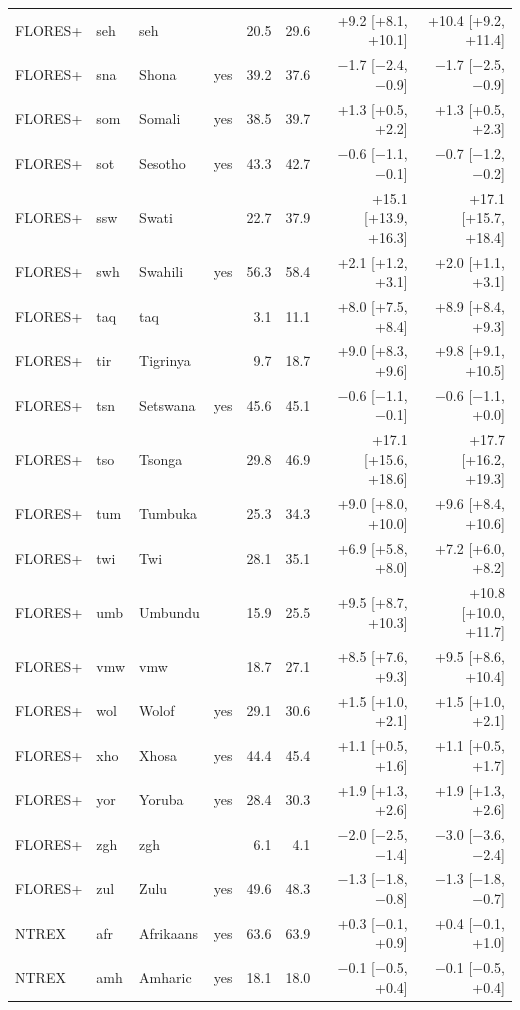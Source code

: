 {\begin{longtable}{@{}lllcrrrr@{}}
FLORES+ & seh & seh &  & 20.5 & 29.6 & +9.2 [+8.1, +10.1] & +10.4 [+9.2, +11.4] \\
FLORES+ & sna & Shona & yes & 39.2 & 37.6 & $-$1.7 [$-$2.4, $-$0.9] & $-$1.7 [$-$2.5, $-$0.9] \\
FLORES+ & som & Somali & yes & 38.5 & 39.7 & +1.3 [+0.5, +2.2] & +1.3 [+0.5, +2.3] \\
FLORES+ & sot & Sesotho & yes & 43.3 & 42.7 & $-$0.6 [$-$1.1, $-$0.1] & $-$0.7 [$-$1.2, $-$0.2] \\
FLORES+ & ssw & Swati &  & 22.7 & 37.9 & +15.1 [+13.9, +16.3] & +17.1 [+15.7, +18.4] \\
FLORES+ & swh & Swahili & yes & 56.3 & 58.4 & +2.1 [+1.2, +3.1] & +2.0 [+1.1, +3.1] \\
FLORES+ & taq & taq &  & 3.1 & 11.1 & +8.0 [+7.5, +8.4] & +8.9 [+8.4, +9.3] \\
FLORES+ & tir & Tigrinya &  & 9.7 & 18.7 & +9.0 [+8.3, +9.6] & +9.8 [+9.1, +10.5] \\
FLORES+ & tsn & Setswana & yes & 45.6 & 45.1 & $-$0.6 [$-$1.1, $-$0.1] & $-$0.6 [$-$1.1, +0.0] \\
FLORES+ & tso & Tsonga &  & 29.8 & 46.9 & +17.1 [+15.6, +18.6] & +17.7 [+16.2, +19.3] \\
FLORES+ & tum & Tumbuka &  & 25.3 & 34.3 & +9.0 [+8.0, +10.0] & +9.6 [+8.4, +10.6] \\
FLORES+ & twi & Twi &  & 28.1 & 35.1 & +6.9 [+5.8, +8.0] & +7.2 [+6.0, +8.2] \\
FLORES+ & umb & Umbundu &  & 15.9 & 25.5 & +9.5 [+8.7, +10.3] & +10.8 [+10.0, +11.7] \\
FLORES+ & vmw & vmw &  & 18.7 & 27.1 & +8.5 [+7.6, +9.3] & +9.5 [+8.6, +10.4] \\
FLORES+ & wol & Wolof & yes & 29.1 & 30.6 & +1.5 [+1.0, +2.1] & +1.5 [+1.0, +2.1] \\
FLORES+ & xho & Xhosa & yes & 44.4 & 45.4 & +1.1 [+0.5, +1.6] & +1.1 [+0.5, +1.7] \\
FLORES+ & yor & Yoruba & yes & 28.4 & 30.3 & +1.9 [+1.3, +2.6] & +1.9 [+1.3, +2.6] \\
FLORES+ & zgh & zgh &  & 6.1 & 4.1 & $-$2.0 [$-$2.5, $-$1.4] & $-$3.0 [$-$3.6, $-$2.4] \\
FLORES+ & zul & Zulu & yes & 49.6 & 48.3 & $-$1.3 [$-$1.8, $-$0.8] & $-$1.3 [$-$1.8, $-$0.7] \\
NTREX & afr & Afrikaans & yes & 63.6 & 63.9 & +0.3 [$-$0.1, +0.9] & +0.4 [$-$0.1, +1.0] \\
NTREX & amh & Amharic & yes & 18.1 & 18.0 & $-$0.1 [$-$0.5, +0.4] & $-$0.1 [$-$0.5, +0.4] \\

\end{longtable}}
